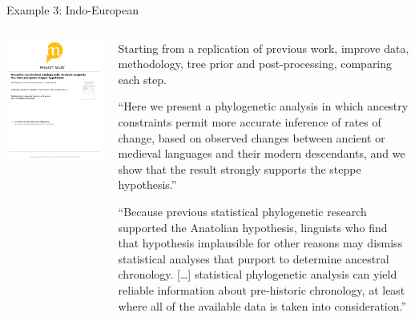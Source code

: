 \documentclass[9pt]{beamer}
\begin{document}
\begin{frame}{Example 3: Indo-European}
  \begin{columns}
    \begin{column}{0.5\textwidth}
      \footnotemark\includegraphics[width=\textwidth,page=7,trim={2cm 9.8cm 2.5cm 1.8cm},clip]{chang2015ancestry.pdf}
    \end{column}
    \begin{column}{0.5\textwidth}
      Starting from a replication of previous work\footnotemark, improve data,
      methodology, tree prior and post-processing, comparing each step.

      \footnotesize “Here we present a phylogenetic analysis in which ancestry
      constraints permit more accurate inference of rates of change, based on
      observed changes between ancient or medieval languages and their modern
      descendants, and we show that the result strongly supports the steppe
      hypothesis.”

      “Because previous statistical phylogenetic research supported the
      Anatolian hypothesis, linguists who find that hypothesis implausible for
      other reasons may dismiss statistical analyses that purport to determine
      ancestral chronology. […] statistical phylogenetic analysis can yield
      reliable information about pre-historic chronology, at least where all of
      the available data is taken into consideration.”
    \end{column}
  \end{columns}
\end{frame}
\end{document}
